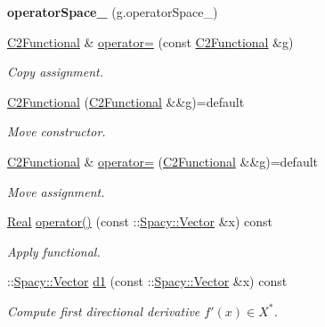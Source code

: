 \begin{DoxyCompactItemize}
\item 
\hypertarget{classSpacy_1_1Kaskade_1_1C2Functional_a96a7f6a98f4f7e20c543792fc9d00626}{{\bfseries operator\-Space\-\_\-} (g.\-operator\-Space\-\_\-)}\label{classSpacy_1_1Kaskade_1_1C2Functional_a96a7f6a98f4f7e20c543792fc9d00626}

\item 
\hyperlink{classSpacy_1_1Kaskade_1_1C2Functional}{C2\-Functional} \& \hyperlink{classSpacy_1_1Kaskade_1_1C2Functional_a1e24c0959890ba4caf0531cf47f3bee5}{operator=} (const \hyperlink{classSpacy_1_1Kaskade_1_1C2Functional}{C2\-Functional} \&g)
\begin{DoxyCompactList}\small\item\em Copy assignment. \end{DoxyCompactList}\item 
\hyperlink{classSpacy_1_1Kaskade_1_1C2Functional_adf3cb62771e39a351db349005ec6bc36}{C2\-Functional} (\hyperlink{classSpacy_1_1Kaskade_1_1C2Functional}{C2\-Functional} \&\&g)=default
\begin{DoxyCompactList}\small\item\em Move constructor. \end{DoxyCompactList}\item 
\hyperlink{classSpacy_1_1Kaskade_1_1C2Functional}{C2\-Functional} \& \hyperlink{classSpacy_1_1Kaskade_1_1C2Functional_a2cabb743e80fa24c22ef0ac358159323}{operator=} (\hyperlink{classSpacy_1_1Kaskade_1_1C2Functional}{C2\-Functional} \&\&g)=default
\begin{DoxyCompactList}\small\item\em Move assignment. \end{DoxyCompactList}\item 
\hyperlink{classSpacy_1_1Real}{Real} \hyperlink{classSpacy_1_1Kaskade_1_1C2Functional_a74b955be1cc2cb7de4e66b434428fd89}{operator()} (const \-::\hyperlink{classSpacy_1_1Vector}{Spacy\-::\-Vector} \&x) const 
\begin{DoxyCompactList}\small\item\em Apply functional. \end{DoxyCompactList}\item 
\-::\hyperlink{classSpacy_1_1Vector}{Spacy\-::\-Vector} \hyperlink{classSpacy_1_1Kaskade_1_1C2Functional_a69d3260b5313bd495e8f5871b15738db}{d1} (const \-::\hyperlink{classSpacy_1_1Vector}{Spacy\-::\-Vector} \&x) const 
\begin{DoxyCompactList}\small\item\em Compute first directional derivative $f'(x) \in X^* $. \end{DoxyCompactList}\item 

\end{DoxyCompactItemize}
